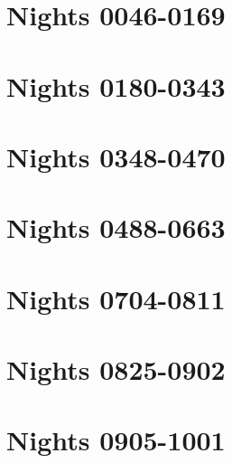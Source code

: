\documentclass[a4paper,12pt,]{book}
\begin{document}
\chapter{Nights 0046-0169}
\newpage


\chapter{Nights 0180-0343}
\newpage


\chapter{Nights 0348-0470}
\newpage


\chapter{Nights 0488-0663}
\newpage


\chapter{Nights 0704-0811}
\newpage


\chapter{Nights 0825-0902}
\newpage


\chapter{Nights 0905-1001}
\newpage


\nocite{mardrus1959mille} %
\nocite{mardrus2002book}


\end{document}
